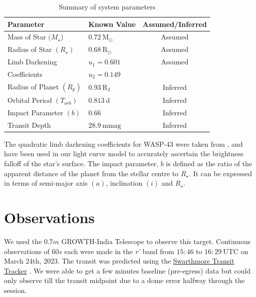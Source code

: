 \documentclass[12pt]{article}
\begin{document}
\begin{table}[h]
    \centering
    \begin{tabular}{l|l|c}
    \hline
    \textbf{Parameter}   & \textbf{Known Value}    &        \textbf{Assumed/Inferred}                      \\
    \hline
    Mass of Star $(M_{\star}$) &   $ 0.72 \ \mathrm{M_{\odot}}$         &   Assumed        \\ \hline
    Radius of Star $(R_{\star})$ &      $ 0.68 \ \mathrm{R_{\odot}}$    &   Assumed        \\ \hline
    Limb Darkening &       $u_1 = 0.601$   &   Assumed      \\ 
    Coefficients &      $u_2 = 0.149$    &           \\ \hline
    Radius of Planet $(R_{p})$     &      $ 0.93 \ \mathrm{R_J}$        &   Inferred         \\   \hline
    Orbital Period $(T_{orb})$     &      $ 0.813 \ \mathrm{d}$          &   Inferred        \\     \hline
    Impact Parameter $(b)$    &      $ 0.66 $                          &   Inferred        \\  \hline
    Transit Depth & $ 28.9 \ \mathrm{mmag}$ & Inferred
    
    \end{tabular}
    \caption{Summary of system parameters \citep{Hellier_2011}} \label{tab}
\end{table}


The quadratic limb darkening coefficients for WASP-43 were taken from \citet{Gillon_2012}, and have been used in our light curve model to accurately ascertain the brightness falloff of the star's surface. The impact parameter, $b$ is defined as the ratio of the apparent distance of the planet from the stellar centre to $R_{\star}$. It can be expressed in terms of semi-major axis $(a)$, inclination $(i)$ and $R_{\star}$.

\section{Observations}
We used the $0.7 m$ GROWTH-India Telescope \citep{Kumar_2022} to observe this target. Continuous observations of $60s$ each were made in the \textit{r'} band from $15{:}46$ to $16{:}29 \ \mathrm{UTC}$ on March 24th, 2023. The transit was predicted using the \href{https://astro.swarthmore.edu/transits/transits.cgi}{Swarthmore Transit Tracker} \citep{2013ascl.soft06007J}. We were able to get a few minutes baseline (pre-egress) data but could only observe till the transit midpoint due to a dome error halfway through the session.
\end{document}
